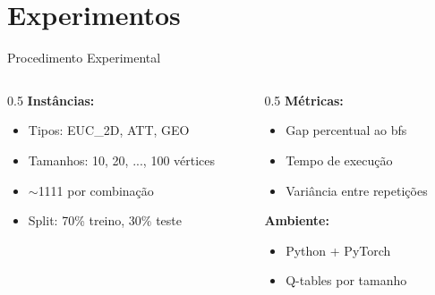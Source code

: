 \documentclass[11pt, xcolor=dvipsnames]{beamer}
\begin{document}
\section{Experimentos}

\begin{frame}{Procedimento Experimental}
  \footnotesize
  \begin{columns}[T]
    \begin{column}{0.5\textwidth}
      \textbf{Instâncias:}
      \begin{itemize}
        \item Tipos: EUC\_2D, ATT, GEO
        \item Tamanhos: 10, 20, ..., 100 vértices
        \item $\sim$1111 por combinação
        \item Split: 70\% treino, 30\% teste
      \end{itemize}
    \end{column}
    \begin{column}{0.5\textwidth}
      \textbf{Métricas:}
      \begin{itemize}
        \item Gap percentual ao bfs
        \item Tempo de execução
        \item Variância entre repetições
      \end{itemize}
      \vspace{2mm}
      \textbf{Ambiente:}
      \begin{itemize}
        \item Python + PyTorch
        \item Q-tables por tamanho
      \end{itemize}
    \end{column}
  \end{columns}
\end{frame}
\end{document}
